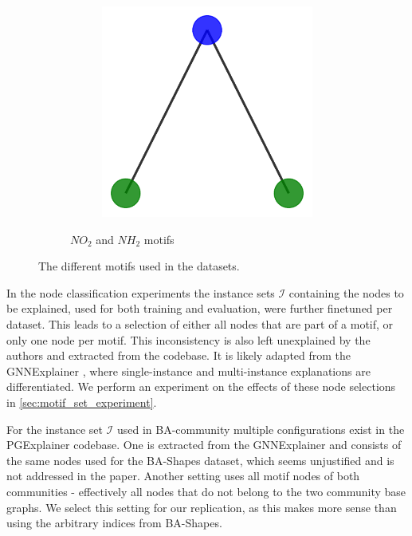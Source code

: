 \begin{figure}[h]
\begin{subfigure}[b]{0.30\textwidth}
\begin{subfigure}[b]{0.48\linewidth}
        \end{subfigure}
        \begin{subfigure}[b]{0.48\linewidth}
            \includegraphics[width=\linewidth]{img/Motif_Vis/MUTAG-MOTIF2.pdf}
        \end{subfigure}
        \caption{$NO_2$ and $NH_2$ motifs}
        \label{fig:subfig4}
    \end{subfigure}
    
    \caption[The different motifs used in the datasets]{The different motifs used in the datasets.}
    \label{fig:motifs}
\end{figure}

In the node classification experiments the instance sets $\mathcal{I}$ containing the nodes to be explained, used for both training and evaluation, were further finetuned per dataset. This leads to a selection of either all nodes that are part of a motif, or only one node per motif. This inconsistency is also left unexplained by the authors and extracted from the codebase. It is likely adapted from the GNNExplainer \cite{ying2019gnnexplainer}, where single-instance and multi-instance explanations are differentiated. We perform an experiment on the effects of these node selections in \ref{sec:motif_set_experiment}.

For the instance set $\mathcal{I}$ used in BA-community multiple configurations exist in the PGExplainer codebase. One is extracted from the GNNExplainer \cite{ying2019gnnexplainer} and consists of the same nodes used for the BA-Shapes dataset, which seems unjustified and is not addressed in the paper. Another setting uses all motif nodes of both communities - effectively all nodes that do not belong to the two community base graphs. We select this setting for our replication, as this makes more sense than using the arbitrary indices from BA-Shapes. \bigskip

